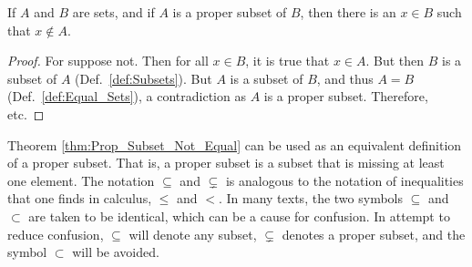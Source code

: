             \begin{theorem}
                \label{thm:Prop_Subset_Not_Equal}%
                If $A$ and $B$ are sets, and if $A$ is a proper
                subset of $B$, then there is an $x\in{B}$ such
                that $x\notin{A}$.
            \end{theorem}
            \begin{proof}
                For suppose not. Then for all $x\in{B}$,
                it is true that $x\in{A}$. But then
                $B$ is a subset of $A$ (Def.~\ref{def:Subsets}).
                But $A$ is a subset of $B$, and thus $A=B$
                (Def.~\ref{def:Equal_Sets}), a contradiction as
                $A$ is a proper subset. Therefore, etc.
            \end{proof}
            Theorem \ref{thm:Prop_Subset_Not_Equal} can
            be used as an equivalent definition of a proper
            subset. That is, a proper subset is a subset that
            is missing at least one element. The notation
            $\subseteq$ and $\subsetneq$ is analogous to the
            notation of inequalities that one finds in calculus,
            $\leq$ and $<$. In many texts, the two symbols
            $\subseteq$ and $\subset$ are taken to be identical,
            which can be a cause for confusion. In attempt to
            reduce confusion, $\subseteq$ will denote any subset,
            $\subsetneq$ denotes a proper subset, and the symbol
            $\subset$ will be avoided.
